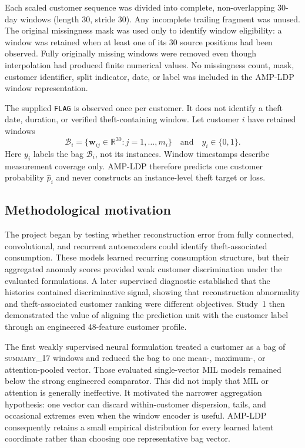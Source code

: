 Each scaled customer sequence was divided into complete, non-overlapping 30-day windows (length 30, stride 30). Any incomplete trailing fragment was unused. The original missingness mask was used only to identify window eligibility: a window was retained when at least one of its 30 source positions had been observed. Fully originally missing windows were removed even though interpolation had produced finite numerical values. No missingness count, mask, customer identifier, split indicator, date, or label was included in the AMP-LDP window representation.

The supplied \texttt{FLAG} is observed once per customer. It does not identify a theft date, duration, or verified theft-containing window. Let customer $i$ have retained windows
\begin{equation}
  \mathcal{B}_i=\{\mathbf{w}_{ij}\in\mathbb{R}^{30}:j=1,\ldots,m_i\}
  \quad\text{and}\quad y_i\in\{0,1\}.
  \label{eq:customer-bag}
\end{equation}
Here $y_i$ labels the bag $\mathcal{B}_i$, not its instances. Window timestamps describe measurement coverage only. AMP-LDP therefore predicts one customer probability $\hat p_i$ and never constructs an instance-level theft target or loss.

\subsection{Methodological motivation}

The project began by testing whether reconstruction error from fully connected, convolutional, and recurrent autoencoders could identify theft-associated consumption. These models learned recurring consumption structure, but their aggregated anomaly scores provided weak customer discrimination under the evaluated formulations. A later supervised diagnostic established that the histories contained discriminative signal, showing that reconstruction abnormality and theft-associated customer ranking were different objectives. Study~1 then demonstrated the value of aligning the prediction unit with the customer label through an engineered 48-feature customer profile.

The first weakly supervised neural formulation treated a customer as a bag of \textsc{summary\_17} windows and reduced the bag to one mean-, maximum-, or attention-pooled vector. Those evaluated single-vector MIL models remained below the strong engineered comparator. This did not imply that MIL or attention is generally ineffective. It motivated the narrower aggregation hypothesis: one vector can discard within-customer dispersion, tails, and occasional extremes even when the window encoder is useful. AMP-LDP consequently retains a small empirical distribution for every learned latent coordinate rather than choosing one representative bag vector.

